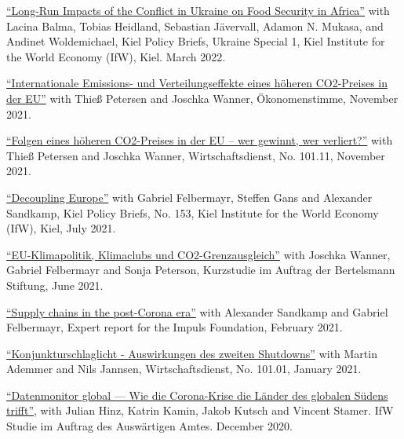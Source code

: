 \documentclass{article}
\begin{document}
\begin{minipage}[t]{0.8\textwidth}
    \href{https://www.ifw-kiel.de/publications/kiel-policy-brief/ukraine-special/long-run-impacts-of-the-conflict-in-ukraine-on-food-security-in-africa-17165/}{``Long-Run Impacts of the Conflict in Ukraine on Food Security in Africa''} with Lacina Balma, Tobias Heidland, Sebastian Jävervall, Adamon N. Mukasa, and Andinet Woldemichael, Kiel Policy Briefs, Ukraine Special 1, Kiel Institute for the World Economy (IfW), Kiel. March 2022. \par
    \href{https://www.oekonomenstimme.org/artikel/2021/11/internationale-emissions--und-verteilungseffekte-eines-hoeheren-co2-preises-in-der-eu/}{``Internationale Emissions- und Verteilungseffekte eines höheren CO2-Preises in der EU''} with Thieß Petersen and Joschka Wanner, Ökonomenstimme, November 2021. \par
    \href{https://www.wirtschaftsdienst.eu/inhalt/jahr/2021/heft/11/beitrag/folgen-eines-hoeheren-co2-preises-in-der-eu-wer-gewinnt-wer-verliert.html}{``Folgen eines höheren CO2-Preises in der EU – wer gewinnt, wer verliert?''} with Thieß Petersen and Joschka Wanner, Wirtschaftsdienst, No. 101.11, November 2021. \par
    \href{https://www.ifw-kiel.de/publications/kiel-policy-briefs/2021/decoupling-europe-16271/}{``Decoupling Europe''} with Gabriel Felbermayr, Steffen Gans and Alexander Sandkamp, Kiel Policy Briefs, No. 153, Kiel Institute for the World Economy (IfW), Kiel, July 2021. \par
    \href{https://www.bertelsmann-stiftung.de/de/publikationen/publikation/did/eu-klimapolitik-klimaclubs-und-co2-grenzausgleich}{``EU-Klimapolitik, Klimaclubs und CO2-Grenzausgleich''} with Joschka Wanner, Gabriel Felbermayr and Sonja Peterson, Kurzstudie im Auftrag der Bertelsmann Stiftung, June 2021. \par
    \href{https://www.ifw-kiel.de/publications/policy-papers/2021/supply-chains-in-the-post-corona-era-in-german-15841/}{``Supply chains in the post-Corona era''} with Alexander Sandkamp and Gabriel Felbermayr, Expert report for the Impuls Foundation, February 2021. \par
    \href{https://www.wirtschaftsdienst.eu/inhalt/jahr/2021/heft/1/beitrag/auswirkungen-des-zweiten-shutdowns.html}{``Konjunkturschlaglicht - Auswirkungen des zweiten Shutdowns''} with Martin Ademmer and Nils Jannsen, Wirtschaftsdienst, No. 101.01, January 2021. \par
    \href{https://www.ifw-kiel.de/de/publikationen/policy-papers/2021/corona-krise-datenmonitor-global-0/}{``Datenmonitor global — Wie die Corona-Krise die Länder des globalen Südens trifft''}, with Julian Hinz, Katrin Kamin, Jakob Kutsch and Vincent Stamer. IfW Studie im Auftrag des Auswärtigen Amtes. December 2020. \par
\end{minipage}
\medskip
\end{document}
